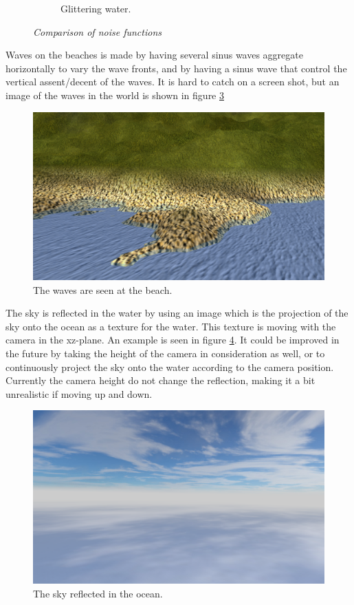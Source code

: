 \begin{figure}[H]
\begin{subfigure}{.5\textwidth}
  \caption{Glittering water.}
  \label{fig:waterGlistering}
\end{subfigure}
\caption[Noise comparison]{\textit{Comparison of noise functions}}
\label{fig:water}
\end{figure}
Waves on the beaches is made by having several sinus waves aggregate horizontally to vary the wave fronts, and by having a sinus wave that control the vertical assent/decent of the waves. It is hard to catch on a screen shot, but an image of the waves in the world is shown in figure \ref{fig:waves}
\begin{figure}[H]
  \centering
  \includegraphics[width=0.9\linewidth]{images/waves.png}
  \caption{The waves are seen at the beach.}
  \label{fig:waves}
\end{figure}%
The sky is reflected in the water by using an image which is the projection of the sky onto the ocean as a texture for the water. This texture is moving with the camera in the xz-plane. An example is seen in figure \ref{fig:skyReflection}. It could be improved in the future by taking the height of the camera in consideration as well, or to continuously project the sky onto the water according to the camera position. Currently the camera height do not change the reflection, making it a bit unrealistic if moving up and down.
\begin{figure}[H]
  \centering
  \includegraphics[width=0.9\linewidth]{images/reflectingSky.png}
  \caption{The sky reflected in the ocean.}
  \label{fig:skyReflection}
\end{figure}%

